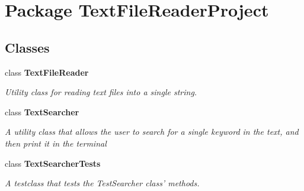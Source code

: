 \section{Package Text\+File\+Reader\+Project}
\label{namespace_text_file_reader_project}
\subsection*{Classes}
\begin{DoxyCompactItemize}
\item 
class {\bfseries Text\+File\+Reader}
\begin{DoxyCompactList}\small\item\em Utility class for reading text files into a single string. \end{DoxyCompactList}\item 
class {\bf Text\+Searcher}
\begin{DoxyCompactList}\small\item\em A utility class that allows the user to search for a single keyword in the text, and then print it in the terminal \end{DoxyCompactList}\item 
class {\bf Text\+Searcher\+Tests}
\begin{DoxyCompactList}\small\item\em A testclass that tests the Test\+Searcher class' methods. \end{DoxyCompactList}\end{DoxyCompactItemize}
